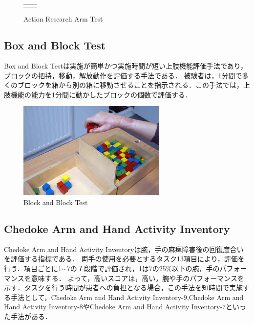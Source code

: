 \begin{figure}[H]
\begin{center}
\begin{tabular}{cc}
{} \\
\end{tabular}
\end{center}
   \caption{Action Research Arm Test\cite{Hsieh2009}}
\label{fig:ARAT}
\end{figure}


\subsection*{Box and Block Test}
Box and Block Test\cite{T.2005,Mathiowetz1985,Desrosiers1993,Lin2010}は実施が簡単かつ実施時間が短い上肢機能評価手法であり，ブロックの把持，移動，解放動作を評価する手法である．
被験者は，1分間で多くのブロックを箱から別の箱に移動させることを指示される．この手法では，上肢機能の能力を1分間に動かしたブロックの個数で評価する．
\begin{figure}[H]
  \centering
  \includegraphics[width=0.8\linewidth]{fig/ch1/babt}
  \caption{Block and Block Test\cite{T.2005}}
  \label{fig:babt}
\end{figure}

\subsection*{Chedoke Arm and Hand Activity Inventory}
Chedoke Arm and Hand Activity Inventory\cite{Barreca2004,Barreca2006,Barreca2005,Johnson2017}は腕，手の麻痺障害後の回復度合いを評価する指標である．
両手の使用を必要とするタスク13項目により，評価を行う．項目ごとに1$\sim$7の７段階で評価され，1は7の25\%以下の腕，手のパフォーマンスを意味する．
よって，高いスコアは，高い，腕や手のパフォーマンスを示す．タスクを行う時間が患者への負担となる場合，この手法を短時間で実施する手法として，Chedoke Arm and Hand Activity Inventory-9,Chedoke Arm and Hand Activity Inventory-8やChedoke Arm and Hand Activity Inventory-7といった手法がある．

